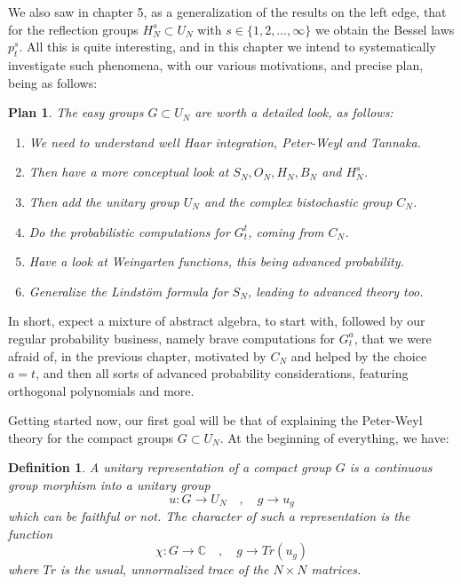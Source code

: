 \documentclass[12pt]{amsbook}
\newtheorem{definition}[theorem]{Definition}
\newtheorem{plan}[theorem]{Plan}
\begin{document}
We also saw in chapter 5, as a generalization of the results on the left edge, that for the reflection groups $H_N^s\subset U_N$ with $s\in\{1,2,\ldots,\infty\}$ we obtain the Bessel laws $p^s_t$. All this is quite interesting, and in this chapter we intend to systematically investigate such phenomena, with our various motivations, and precise plan, being as follows:

\begin{plan}
The easy groups $G\subset U_N$ are worth a detailed look, as follows:
\begin{enumerate}
\item We need to understand well Haar integration, Peter-Weyl and Tannaka.

\item Then have a more conceptual look at $S_N,O_N,H_N,B_N$ and $H_N^s$.

\item Then add the unitary group $U_N$ and the complex bistochastic group $C_N$.

\item Do the probabilistic computations for $G_t^t$, coming from $C_N$.

\item Have a look at Weingarten functions, this being advanced probability.

\item Generalize the Lindst\"om formula for $S_N$, leading to advanced theory too.
\end{enumerate}
\end{plan}

In short, expect a mixture of abstract algebra, to start with, followed by our regular probability business, namely brave computations for $G_t^a$, that we were afraid of, in the previous chapter, motivated by $C_N$ and helped by the choice $a=t$, and then all sorts of advanced probability considerations, featuring orthogonal polynomials and more.

\bigskip

Getting started now, our first goal will be that of explaining the Peter-Weyl theory for the compact groups $G\subset U_N$. At the beginning of everything, we have:

\begin{definition}
A unitary representation of a compact group $G$ is a continuous group morphism into a unitary group
$$u:G\to U_N\quad,\quad g\to u_g$$
which can be faithful or not. The character of such a representation is the function
$$\chi:G\to\mathbb C\quad,\quad g\to Tr(u_g)$$
where $Tr$ is the usual, unnormalized trace of the $N\times N$ matrices.
\end{definition}
\end{document}
